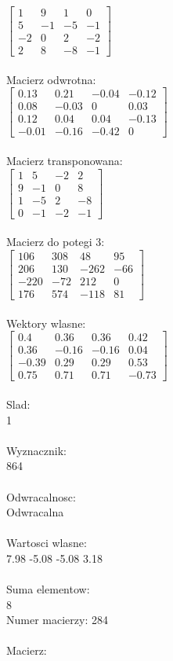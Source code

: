 \documentclass[a4paper,12pt]{article}
\begin{document}
$\begin{bmatrix} 1&9&1&0\\5&-1&-5&-1\\-2&0&2&-2\\2&8&-8&-1 \end{bmatrix}$
\\
\\
Macierz odwrotna:\\

$\begin{bmatrix} 0.13&0.21&-0.04&-0.12\\0.08&-0.03&0&0.03\\0.12&0.04&0.04&-0.13\\-0.01&-0.16&-0.42&0 \end{bmatrix}$
\\
\\
Macierz transponowana:\\

$\begin{bmatrix} 1&5&-2&2\\9&-1&0&8\\1&-5&2&-8\\0&-1&-2&-1 \end{bmatrix}$
\\
\\
Macierz do potegi 3:\\

$\begin{bmatrix} 106&308&48&95\\206&130&-262&-66\\-220&-72&212&0\\176&574&-118&81 \end{bmatrix}$
\\
\\
Wektory wlasne:\\

$\begin{bmatrix} 0.4&0.36&0.36&0.42\\0.36&-0.16&-0.16&0.04\\-0.39&0.29&0.29&0.53\\0.75&0.71&0.71&-0.73 \end{bmatrix}$
\\
\\
Slad:\\
1
\\
\\
Wyznacznik:\\
864
\\
\\
Odwracalnosc:\\
Odwracalna
\\
\\
Wartosci wlasne:\\
7.98 -5.08 -5.08 3.18
\\
\\
Suma elementow:\\
8
\\
\newpage
Numer macierzy:
284
\\
\\
Macierz:\\
\end{document}
